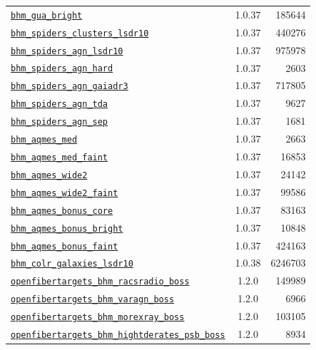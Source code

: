 \begin{table}[ht]
\begin{tabular}{lcr}
\hyperref[bhm_gua_bright_plan1.0.37]{\texttt{bhm\_gua\_bright}} & 1.0.37 & 185644 \\
\hyperref[bhm_spiders_clusters_lsdr10_plan1.0.37]{\texttt{bhm\_spiders\_clusters\_lsdr10}} & 1.0.37 & 440276 \\
\hyperref[bhm_spiders_agn_lsdr10_plan1.0.37]{\texttt{bhm\_spiders\_agn\_lsdr10}} & 1.0.37 & 975978 \\
\hyperref[bhm_spiders_agn_hard_plan1.0.37]{\texttt{bhm\_spiders\_agn\_hard}} & 1.0.37 & 2603 \\
\hyperref[bhm_spiders_agn_gaiadr3_plan1.0.37]{\texttt{bhm\_spiders\_agn\_gaiadr3}} & 1.0.37 & 717805 \\
\hyperref[bhm_spiders_agn_tda_plan1.0.37]{\texttt{bhm\_spiders\_agn\_tda}} & 1.0.37 & 9627 \\
\hyperref[bhm_spiders_agn_sep_plan1.0.37]{\texttt{bhm\_spiders\_agn\_sep}} & 1.0.37 & 1681 \\
\hyperref[bhm_aqmes_med_plan1.0.37]{\texttt{bhm\_aqmes\_med}} & 1.0.37 & 2663 \\
\hyperref[bhm_aqmes_med_faint_plan1.0.37]{\texttt{bhm\_aqmes\_med\_faint}} & 1.0.37 & 16853 \\
\hyperref[bhm_aqmes_wide2_plan1.0.37]{\texttt{bhm\_aqmes\_wide2}} & 1.0.37 & 24142 \\
\hyperref[bhm_aqmes_wide2_faint_plan1.0.37]{\texttt{bhm\_aqmes\_wide2\_faint}} & 1.0.37 & 99586 \\
\hyperref[bhm_aqmes_bonus_core_plan1.0.37]{\texttt{bhm\_aqmes\_bonus\_core}} & 1.0.37 & 83163 \\
\hyperref[bhm_aqmes_bonus_bright_plan1.0.37]{\texttt{bhm\_aqmes\_bonus\_bright}} & 1.0.37 & 10848 \\
\hyperref[bhm_aqmes_bonus_faint_plan1.0.37]{\texttt{bhm\_aqmes\_bonus\_faint}} & 1.0.37 & 424163 \\
\hyperref[bhm_colr_galaxies_lsdr10_plan1.0.38]{\texttt{bhm\_colr\_galaxies\_lsdr10}} & 1.0.38 & 6246703 \\
\hyperref[openfibertargets_bhm_racsradio_boss_plan1.2.0]{\texttt{openfibertargets\_bhm\_racsradio\_boss}} & 1.2.0 & 149989 \\
\hyperref[openfibertargets_bhm_varagn_boss_plan1.2.0]{\texttt{openfibertargets\_bhm\_varagn\_boss}} & 1.2.0 & 6966 \\
\hyperref[openfibertargets_bhm_morexray_boss_plan1.2.0]{\texttt{openfibertargets\_bhm\_morexray\_boss}} & 1.2.0 & 103105 \\
\hyperref[openfibertargets_bhm_hightderates_psb_boss_plan1.2.0]{\texttt{openfibertargets\_bhm\_hightderates\_psb\_boss}} & 1.2.0 & 8934 \\

\end{tabular}
\end{table}
